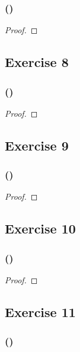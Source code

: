 \documentclass[14pt]{extarticle}
\begin{document}
\subsubsection{()}

\begin{proof}

\end{proof}

\subsection{Exercise 8}

\subsubsection{()}

\begin{proof}

\end{proof}

\subsection{Exercise 9}

\subsubsection{()}

\begin{proof}

\end{proof}

\subsection{Exercise 10}

\subsubsection{()}

\begin{proof}

\end{proof}

\subsection{Exercise 11}

\subsubsection{()}
\end{document}
